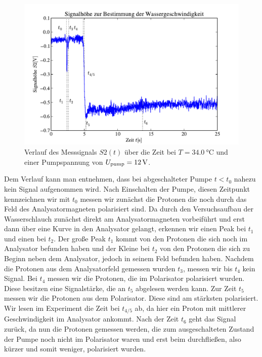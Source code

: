 \documentclass[paper=a4,
	fontsize=10pt,
	DIV=18,
	twocolumn,
	parskip=half
	]{scrartcl}
\numberwithin{equation}{section}    %
\begin{document}
\begin{figure}[htp]
	\begin{center}
		\includegraphics[width=\columnwidth]{Data-Plots/06-wassergeschwindigkeit.pdf}
		\caption{Verlauf des Messsignals $S2(t)$ über die Zeit bei $T=\SI{34.0}{\celsius}$ und einer Pumpspannung von $U_{\rm pump}=\SI{12}{\volt}$.}
		\label{fig.wassergeschwindigkeit}
	\end{center}
\end{figure}

Dem Verlauf kann man entnehmen, dass bei abgeschalteter Pumpe $t<t_0$ nahezu kein Signal aufgenommen wird. Nach Einschalten der Pumpe, diesen Zeitpunkt kennzeichnen wir mit $t_0$ messen wir zunächst die Protonen die noch durch das Feld des Analysatormagneten polarisiert sind. Da durch den Versuchsaufbau der Wasserschlauch zunächst direkt am Analysatormagneten vorbeiführt und erst dann über eine Kurve in den Analysator gelangt, erkennen wir einen Peak bei $t_1$ und einen bei $t_2$. Der große Peak $t_1$ kommt von den Protonen die sich noch im Analysator befunden haben und der Kleine bei $t_2$ von den Protonen die sich zu Beginn neben dem Analysator, jedoch in seinem Feld befunden haben. Nachdem die Protonen aus dem Analysatorfeld gemessen wurden $t_3$, messen wir bis $t_4$ kein Signal. Bei $t_4$ messen wir die Protonen, die im Polarisator polarisiert wurden. Diese besitzen eine Signalstärke, die an $t_5$ abgelesen werden kann. Zur Zeit $t_5$ messen wir die Protonen aus dem Polarisator. Diese sind am stärksten polarisiert. Wir lesen im Experiment die Zeit bei $t_{4/5}$ ab, da hier ein Proton mit mittlerer Geschwindigkeit im Analysator ankommt. Nach der Zeit $t_6$ geht das Signal zurück, da nun die Protonen gemessen werden, die zum ausgeschalteten Zustand der Pumpe noch nicht im Polarisator waren und erst beim durchfließen, also kürzer und somit weniger, polarisiert wurden.
\end{document}
